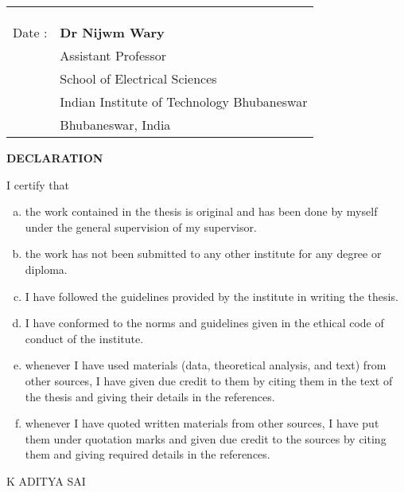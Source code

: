 \begin{tabular*}{\textwidth}{@{\extracolsep{\fill}}ll}
	&\\
	&\\
	&\\
	Date : & \textbf{Dr Nijwm Wary}\\
	& Assistant Professor\\
	& School of Electrical Sciences \\
	& Indian Institute of Technology Bhubaneswar \\
	& Bhubaneswar, India \\
\end{tabular*}



\newpage

\thispagestyle{empty}
\begin{center}
	\textbf{\Large DECLARATION}
\end{center}
I certify that
\begin{enumerate}[a.]
	\item the work contained in the thesis is original and has been done by myself under the general supervision of my supervisor.
	\item the work has not been submitted to any other institute for any degree or diploma.
	\item I have followed the guidelines provided by the institute in writing the thesis.
	\item I have conformed to the norms and guidelines given in the ethical code of conduct of the institute.
	\item whenever I have used materials (data, theoretical analysis, and text) from other sources, I have given due credit to them by citing them in the text of the thesis and giving their details in the references.
	\item whenever I have quoted written materials from other sources, I have put them under quotation marks and given due credit to the sources by citing them and giving required details in the references.
\end{enumerate}
\vspace{4em}
\begin{flushright}
	K ADITYA SAI
\end{flushright}

